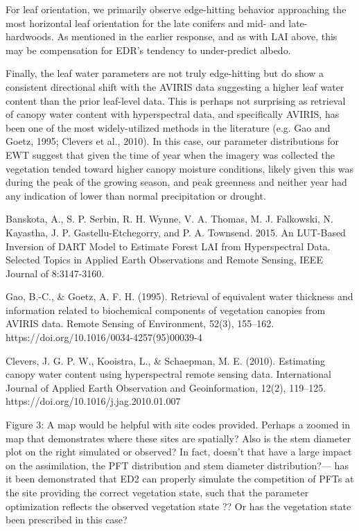 For leaf orientation, we primarily observe edge-hitting behavior approaching the most horizontal leaf orientation for the late conifers and mid- and late-hardwoods. As mentioned in the earlier response, and as with LAI above, this may be compensation for EDR’s tendency to under-predict albedo.

Finally, the leaf water parameters are not truly edge-hitting but do show a consistent directional shift with the AVIRIS data suggesting a higher leaf water content than the prior leaf-level data. This is perhaps not surprising as retrieval of canopy water content with hyperspectral data, and specifically AVIRIS, has been one of the most widely-utilized methods in the literature (e.g. Gao and Goetz, 1995; Clevers et al., 2010). In this case, our parameter distributions for EWT suggest that given the time of year when the imagery was collected the vegetation tended toward higher canopy moisture conditions, likely given this was during the peak of the growing season, and peak greenness and neither year had any indication of lower than normal precipitation or drought.

\medskip
\noindent Banskota, A., S. P. Serbin, R. H. Wynne, V. A. Thomas, M. J. Falkowski, N. Kayastha, J. P. Gastellu-Etchegorry, and P. A. Townsend. 2015. An LUT-Based Inversion of DART Model to Estimate Forest LAI from Hyperspectral Data. Selected Topics in Applied Earth Observations and Remote Sensing, IEEE Journal of 8:3147-3160.

\medskip
\noindent Gao, B.-C., \& Goetz, A. F. H. (1995). Retrieval of equivalent water thickness and information related to biochemical components of vegetation canopies from AVIRIS data. Remote Sensing of Environment, 52(3), 155–162. https://doi.org/10.1016/0034-4257(95)00039-4

\medskip
\noindent Clevers, J. G. P. W., Kooistra, L., \& Schaepman, M. E. (2010). Estimating canopy water content using hyperspectral remote sensing data. International Journal of Applied Earth Observation and Geoinformation, 12(2), 119–125. https://doi.org/10.1016/j.jag.2010.01.007

\begin{reviewer}
  Figure 3: A map would be helpful with site codes provided. Perhaps a zoomed in map that demonstrates where these sites are spatially? Also is the stem diameter plot on the right simulated or observed? In fact, doesn’t that have a large impact on the assimilation, the PFT distribution and stem diameter distribution?— has it been demonstrated that ED2 can properly simulate the competition of PFTs at the site providing the correct vegetation state, such that the parameter optimization reflects the observed vegetation state ?? Or has the vegetation state been prescribed in this case?
\end{reviewer}

